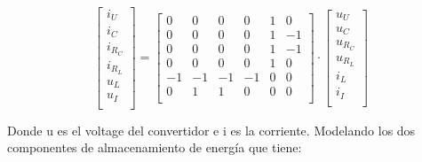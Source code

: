 \vspace{-0.5cm}
\begin{equation}
    \begin{bmatrix}
        i_U\\
        i_C\\
        i_{R_C}\\
        i_{R_L}\\
        u_L\\
        u_I\\
    \end{bmatrix}
    =
    \begin{bmatrix}
        0 & 0 & 0 & 0 & 1 & 0\\
        0 & 0 & 0 & 0 & 1 & -1\\
        0 & 0 & 0 & 0 & 1 & -1\\
        0 & 0 & 0 & 0 & 1 & 0\\
        -1 & -1 & -1 & -1 & 0 & 0\\
        0 & 1 & 1 & 0 & 0 & 0\\
    \end{bmatrix}
    \cdot
    \begin{bmatrix}
        u_U\\
        u_C\\
        u_{R_C}\\
        u_{R_L}\\
        i_L\\
        i_I\\
    \end{bmatrix}
\end{equation}

Donde u es el voltage del convertidor e i es la corriente.
Modelando los dos componentes de almacenamiento de energía que tiene:

